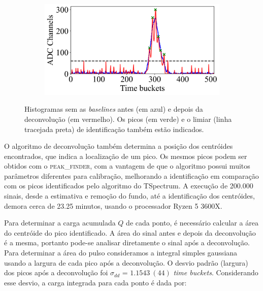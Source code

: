 \documentclass[a4paper,12pt,oneside]{book}
\begin{document}
\begin{figure}[H]
\begin{subfigure}[b]{0.48\textwidth}
        \caption{}
        \label{subfig:ex_sinal_deconv_3}
    \end{subfigure}%
    \hfill
    \begin{subfigure}[b]{0.48\textwidth}
        \centering
        \includegraphics[scale=0.40]{figs/ex_deconv_4.png}
        \caption{}
        \label{subfig:ex_sinal_deconv_4}
    \end{subfigure}
\caption{Histogramas sem as \textit{baselines} antes (em azul) e depois da deconvolução (em vermelho). Os picos (em verde) e o limiar (linha tracejada preta) de identificação também estão indicados.}
\label{fig:ex_sinal_deconv}
\end{figure}

\par O algoritmo de deconvolução também determina a posição dos centróides encontrados, que indica a localização de um pico. Os mesmos picos podem ser obtidos com o \textsc{peak\_finder}, com a vantagem de que o algoritmo possui muitos parâmetros diferentes para calibração, melhorando a identificação em comparação com os picos identificados pelo algoritmo do TSpectrum. A execução de 200.000 sinais, desde a estimativa e remoção do fundo, até a identificação dos centróides, demora cerca de 23.25 minutos, usando o processador Ryzen 5 3600X.

\par Para determinar a carga acumulada $Q$ de cada ponto, é necessário calcular a área do centróide do pico identificado. A área do sinal antes e depois da deconvolução é a mesma, portanto pode-se analisar diretamente o sinal após a deconvolução. Para determinar a área do pulso consideramos a integral simples gaussiana usando a largura de cada pico após a deconvolução. O desvio padrão (largura) dos picos após a deconvolução foi $\sigma_{dd}$ = $1.1543~(44)$ \textit{time buckets}. Considerando esse desvio, a carga integrada para cada ponto é dada por:
\end{document}
